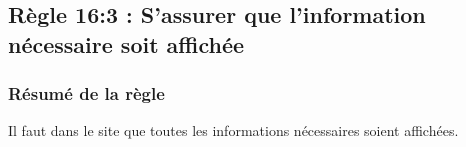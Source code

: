 \documentclass{article}[12pt]
\begin{document}

    \newpage
    \subsection{Règle 16:3 : S'assurer que l'information nécessaire soit affichée }
     \subsubsection*{Résumé de la règle}
  Il faut dans le site que toutes les informations nécessaires soient affichées.
     
\end{document}
